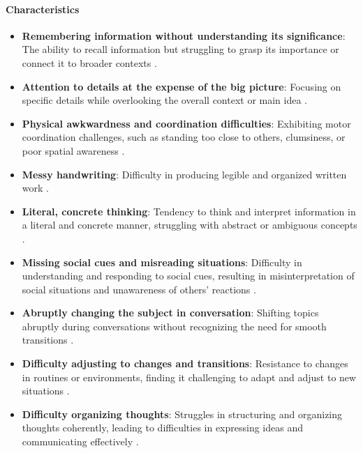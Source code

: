 \paragraph{Characteristics}
\begin{itemize}
    \item \textbf{Remembering information without understanding its significance}: The ability to recall information but struggling to grasp its importance or connect it to broader contexts \cite{understood_nvld_2024}.
    \item \textbf{Attention to details at the expense of the big picture}: Focusing on specific details while overlooking the overall context or main idea \cite{understood_nvld_2024}.
    \item \textbf{Physical awkwardness and coordination difficulties}: Exhibiting motor coordination challenges, such as standing too close to others, clumsiness, or poor spatial awareness \cite{understood_nvld_2024}.
    \item \textbf{Messy handwriting}: Difficulty in producing legible and organized written work \cite{understood_nvld_2024}.
    \item \textbf{Literal, concrete thinking}: Tendency to think and interpret information in a literal and concrete manner, struggling with abstract or ambiguous concepts \cite{understood_nvld_2024}.
    \item \textbf{Missing social cues and misreading situations}: Difficulty in understanding and responding to social cues, resulting in misinterpretation of social situations and unawareness of others' reactions \cite{understood_nvld_2024}.
    \item \textbf{Abruptly changing the subject in conversation}: Shifting topics abruptly during conversations without recognizing the need for smooth transitions \cite{understood_nvld_2024}.
    \item \textbf{Difficulty adjusting to changes and transitions}: Resistance to changes in routines or environments, finding it challenging to adapt and adjust to new situations \cite{understood_nvld_2024}.
    \item \textbf{Difficulty organizing thoughts}: Struggles in structuring and organizing thoughts coherently, leading to difficulties in expressing ideas and communicating effectively \cite{understood_nvld_2024}.
\end{itemize}

